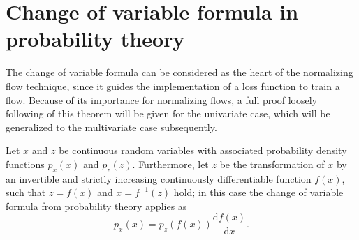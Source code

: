 \documentclass[a4paper,12pt]{report}
\begin{document}
\section{Change of variable formula in probability theory}
The change of variable formula can be considered as the heart of the normalizing flow technique, since it guides the implementation of a loss function to train a flow. Because of its importance for normalizing flows, a full proof loosely following \cite[p.194-195]{Deisenroth.2020} of this theorem will be given for the univariate case, which will be generalized to the multivariate case subsequently.
\begin{tm}
Let $x$ and $z$ be continuous random variables with associated probability density functions $p_x(x)$ and $p_z(z)$. Furthermore, let $z$ be the transformation of $x$ by an invertible and strictly increasing continuously differentiable function $f(x)$, such that $z=f(x)$ and $x = f^{-1}(z)$ hold; in this case the change of variable formula from probability theory applies as \begin{equation}
p_x(x) = p_z(f(x))\frac{\mathrm{d}f(x)}{\mathrm{d}x}.
\end{equation}
\end{tm}
\end{document}
